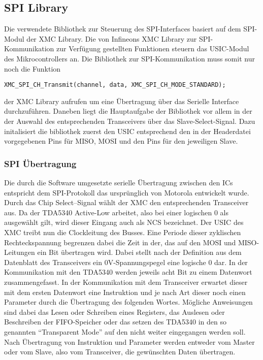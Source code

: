 \subsection{SPI Library}
Die verwendete Bibliothek zur Steuerung des \ac{SPI}-Interfaces basiert auf dem \ac{SPI}-Modul der XMC Library. Die von Infineons XMC Library zur \ac{SPI}-Kommunikation zur Verfügung gestellten Funktionen steuern das \ac{USIC}-Modul des Mikrocontrollers an. Die Bibliothek zur \ac{SPI}-Kommunikation muss somit nur noch die Funktion
\begin{lstlisting}
XMC_SPI_CH_Transmit(channel, data, XMC_SPI_CH_MODE_STANDARD);
\end{lstlisting} der XMC Library aufrufen um eine Übertragung über das Serielle Interface durchzuführen. Daneben liegt die Hauptaufgabe der Bibliothek vor allem in der der Auswahl des entsprechenden Transceivers über das Slave-Select-Signal. Dazu initalisiert die bibliothek zuerst den \ac{USIC} entsprechend den in der Headerdatei vorgegebenen Pins für MISO, MOSI und den Pins für den jeweiligen Slave.

\subsubsection{SPI Übertragung}
Die durch die Software umgesetzte serielle Übertragung zwischen den \acp{IC} entspricht dem \ac{SPI}-Protokoll das ursprünglich von Motorola entwickelt wurde\cite{BuchSPI}. Durch das Chip Select–Signal wählt der XMC den entsprechenden Transceiver aus. Da der TDA5340 Active-Low arbeitet, also bei einer logischen $0$ als ausgewählt gilt, wird dieser Eingang auch als \ac{NCS} bezeichnet. 
Der \ac{USIC} des XMC treibt nun die Clockleitung des Busses. Eine Periode dieser zyklischen Rechteckspannung begrenzen dabei die Zeit in der, das auf den \ac{MOSI} und \ac{MISO}-Leitungen ein Bit übertragen wird. Dabei stellt nach der Definition aus dem Datenblatt des Transceivers ein $0$V-Spannungspegel eine logische $0$ dar. In der Kommunikation mit den TDA5340 werden jeweils acht Bit zu einem Datenwort zusammengefasst. In der Kommunikation mit dem Transceiver erwartet dieser mit dem ersten Datenwort eine Instruktion und je nach Art dieser noch einen Parameter durch die Übertragung des folgenden Wortes. Mögliche Anweisungen sind dabei das Lesen oder Schreiben eines Registers, das Auslesen oder Beschreiben der \ac{FIFO}-Speicher oder das setzen des TDA5340 in den so genannten \enquote{Transparent Mode} auf den nicht weiter eingegangen werden soll. Nach Übertragung von Instruktion und Parameter werden entweder vom Master oder vom Slave, also vom Transceiver, die gewünschten Daten übertragen.

